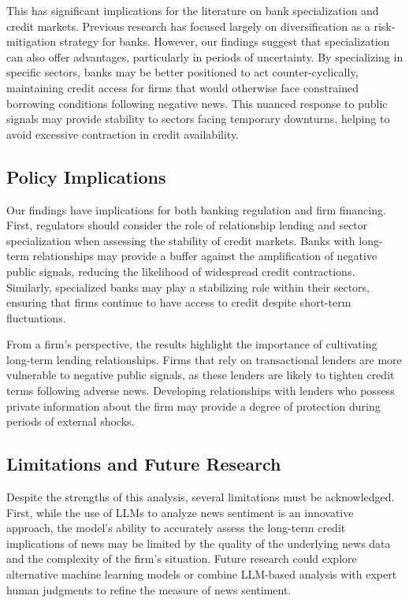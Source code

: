 This has significant implications for the literature on bank specialization and credit markets. Previous research has focused largely on diversification as a risk-mitigation strategy for banks. However, our findings suggest that specialization can also offer advantages, particularly in periods of uncertainty. By specializing in specific sectors, banks may be better positioned to act counter-cyclically, maintaining credit access for firms that would otherwise face constrained borrowing conditions following negative news. This nuanced response to public signals may provide stability to sectors facing temporary downturns, helping to avoid excessive contraction in credit availability.

\subsection{Policy Implications}

Our findings have implications for both banking regulation and firm financing. First, regulators should consider the role of relationship lending and sector specialization when assessing the stability of credit markets. Banks with long-term relationships may provide a buffer against the amplification of negative public signals, reducing the likelihood of widespread credit contractions. Similarly, specialized banks may play a stabilizing role within their sectors, ensuring that firms continue to have access to credit despite short-term fluctuations.

From a firm's perspective, the results highlight the importance of cultivating long-term lending relationships. Firms that rely on transactional lenders are more vulnerable to negative public signals, as these lenders are likely to tighten credit terms following adverse news. Developing relationships with lenders who possess private information about the firm may provide a degree of protection during periods of external shocks.

\subsection{Limitations and Future Research}

Despite the strengths of this analysis, several limitations must be acknowledged. First, while the use of LLMs to analyze news sentiment is an innovative approach, the model's ability to accurately assess the long-term credit implications of news may be limited by the quality of the underlying news data and the complexity of the firm's situation. Future research could explore alternative machine learning models or combine LLM-based analysis with expert human judgments to refine the measure of news sentiment.

